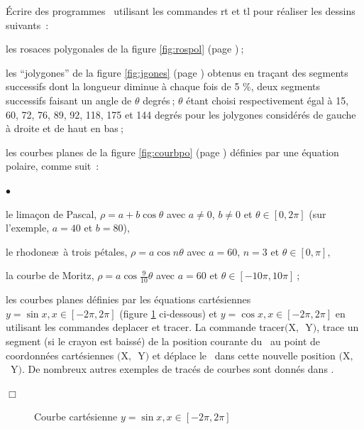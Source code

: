 \begin{exercices}{Écrire des programmes \pascal\  utilisant les commandes {\idt rt}
et {\idt tl} pour réaliser les dessins suivants~:

\tiret les rosaces polygonales de la figure \ref{fig:rospol} (page \pageref{fig:rospol})$\:$;

\tiret les ``jolygones'' de la figure \ref{fig:jgones} (page \pageref{fig:jgones}) obtenus en traçant des
segments successifs dont la longueur diminue à chaque fois de 5 \%, deux segments successifs faisant
un angle de $\theta$ degrés$\:$; $\theta$ étant choisi respectivement égal à 15, 60, 72, 76, 89, 92,
118, 175 et 144 degrés
pour les jolygones 
considérés de gauche
à droite et de haut en bas$\:$;

\tiret les courbes planes de la figure \ref{fig:courbpo} (page \pageref{fig:courbpo})
définies par une équation polaire, comme suit~:
 \begin{list}{$\scriptscriptstyle\bullet$}{
}
   \item le limaçon de Pascal, $\rho = a + b \cos{\theta}$ avec
   $a \neq 0$, $b \neq 0$ et $\theta \in [0, 2\pi]$ (sur l'exemple, $a = 40$ et $b = 80$),
   \item le rhodone\ae\ à trois pétales, $\rho = a \cos{n \theta}$ avec 
    $a = 60$, $n = 3$ et $\theta \in [0, \pi]$,
   \item la courbe de Moritz, $\rho = a \cos{\frac{9}{10} \theta}$ avec 
    $a = 60$ et $\theta \in [-10 \pi, 10 \pi]$$\:$;
   \end{list}

\tiret les courbes planes définies par les équations cartésiennes $y = \sin{x}, x \in [-2\pi, 2\pi]$
  (figure \ref{fig:sin} ci-dessous) et  $y = \cos{x}, x \in [-2\pi, 2\pi]$ en utilisant les commandes {\idt deplacer} 
  et {\idt tracer}. La commande {\idt tracer$($X$,$\ Y$)$},
  trace un segment (si le crayon est baissé) de la position courante du
  \robot\ au point de coordonnées cartésiennes $($X$,$\ Y$)$ et déplace le \robot\ dans
  cette nouvelle position  $($X$,$\ Y$)$.
   De nombreux autres exemples de tracés de courbes sont donnés dans \cite{LT}.

\noindent $\Box$}\end{exercices}
\begin{figure}[htbp]
 \caption{Courbe cartésienne $y = \sin{x}, x \in [-2\pi, 2\pi]$}\label{fig:sin}
\end{figure}
